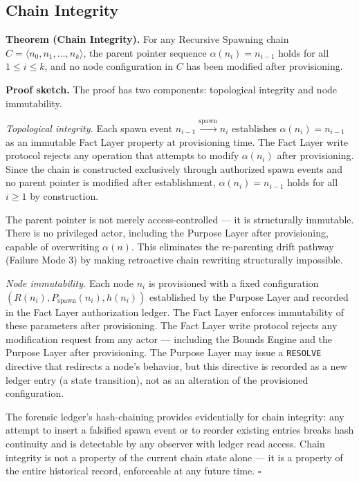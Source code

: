 \subsection{Chain Integrity}
\label{sec:rs-chain-integrity}

\textbf{Theorem (Chain Integrity).} For any Recursive Spawning chain $C = \langle n_0, n_1, \ldots, n_k \rangle$, the parent pointer sequence $\alpha(n_i) = n_{i-1}$ holds for all $1 \leq i \leq k$, and no node configuration in $C$ has been modified after provisioning.

\medskip
\textbf{Proof sketch.} The proof has two components: topological integrity and node immutability.

\medskip
\textit{Topological integrity.} Each spawn event $n_{i-1} \xrightarrow{\text{spawn}} n_i$ establishes $\alpha(n_i) = n_{i-1}$ as an immutable Fact Layer property at provisioning time. The Fact Layer write protocol rejects any operation that attempts to modify $\alpha(n_i)$ after provisioning. Since the chain is constructed exclusively through authorized spawn events and no parent pointer is modified after establishment, $\alpha(n_i) = n_{i-1}$ holds for all $i \geq 1$ by construction.

The parent pointer is not merely access-controlled — it is structurally immutable. There is no privileged actor, including the Purpose Layer after provisioning, capable of overwriting $\alpha(n)$. This eliminates the re-parenting drift pathway (Failure Mode 3) by making retroactive chain rewriting structurally impossible.

\medskip
\textit{Node immutability.} Each node $n_i$ is provisioned with a fixed configuration $(R(n_i), P_{\text{spawn}}(n_i), h(n_i))$ established by the Purpose Layer and recorded in the Fact Layer authorization ledger. The Fact Layer enforces immutability of these parameters after provisioning. The Fact Layer write protocol rejects any modification request from any actor — including the Bounds Engine and the Purpose Layer after provisioning. The Purpose Layer may issue a \texttt{RESOLVE} directive that redirects a node's behavior, but this directive is recorded as a new ledger entry (a state transition), not as an alteration of the provisioned configuration.

\medskip
The forensic ledger's hash-chaining provides evidentially for chain integrity: any attempt to insert a falsified spawn event or to reorder existing entries breaks hash continuity and is detectable by any observer with ledger read access. Chain integrity is not a property of the current chain state alone — it is a property of the entire historical record, enforceable at any future time. $\square$

